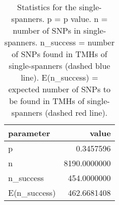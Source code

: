 \begin{table}

\caption{\label{tab:snp_stats_per_spanner_single}Statistics for the single-spanners. p = p value. n = number of SNPs in single-spanners. n_success = number of SNPs found in TMHs of single-spanners (dashed blue line). E(n_success) = expected number of SNPs to be found in TMHs of single-spanners  (dashed red line). }
\centering
\begin{tabular}[t]{l|r}
\hline
parameter & value\\
\hline
p & 0.3457596\\
\hline
n & 8190.0000000\\
\hline
n\_success & 454.0000000\\
\hline
E(n\_success) & 462.6681408\\
\hline
\end{tabular}
\end{table}
